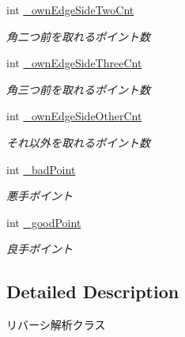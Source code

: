 \begin{DoxyCompactItemize}
int \hyperlink{class_reversi_form_1_1_reversi_anz_aa9fdf3aa53dc4f5998e8dd6c1c7c2ca7}{\+\_\+own\+Edge\+Side\+Two\+Cnt}
\begin{DoxyCompactList}\small\item\em 角二つ前を取れるポイント数 \end{DoxyCompactList}\item 
\mbox{\label{class_reversi_form_1_1_reversi_anz_a6237ac0276f33ff25b647b3bd8bd385b}} 
int \hyperlink{class_reversi_form_1_1_reversi_anz_a6237ac0276f33ff25b647b3bd8bd385b}{\+\_\+own\+Edge\+Side\+Three\+Cnt}
\begin{DoxyCompactList}\small\item\em 角三つ前を取れるポイント数 \end{DoxyCompactList}\item 
\mbox{\label{class_reversi_form_1_1_reversi_anz_ab3c5f29b8b9c8dbb251a141142255e2d}} 
int \hyperlink{class_reversi_form_1_1_reversi_anz_ab3c5f29b8b9c8dbb251a141142255e2d}{\+\_\+own\+Edge\+Side\+Other\+Cnt}
\begin{DoxyCompactList}\small\item\em それ以外を取れるポイント数 \end{DoxyCompactList}\item 
\mbox{\label{class_reversi_form_1_1_reversi_anz_a48b83fdbc6456f48a6e9d7a16b0c0773}} 
int \hyperlink{class_reversi_form_1_1_reversi_anz_a48b83fdbc6456f48a6e9d7a16b0c0773}{\+\_\+bad\+Point}
\begin{DoxyCompactList}\small\item\em 悪手ポイント \end{DoxyCompactList}\item 
\mbox{\label{class_reversi_form_1_1_reversi_anz_a00ddcaaa1174529c632cea5a083f2769}} 
int \hyperlink{class_reversi_form_1_1_reversi_anz_a00ddcaaa1174529c632cea5a083f2769}{\+\_\+good\+Point}
\begin{DoxyCompactList}\small\item\em 良手ポイント \end{DoxyCompactList}\end{DoxyCompactItemize}


\subsection{Detailed Description}
リバーシ解析クラス 

